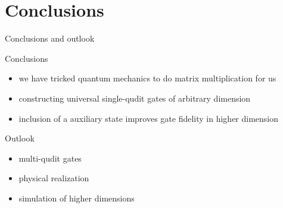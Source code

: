 \documentclass[t]{beamer}
\begin{document}


\section{Conclusions}

\begin{frame}{}
\tableofcontents[ 
currentsubsection, 
hideothersubsections, 
sectionstyle=show/shaded, 
subsectionstyle=show/shaded, 
] 
\end{frame}

\begin{frame}{Conclusions and outlook}
\begin{block}{Conclusions}
\begin{itemize}
\item we have tricked quantum mechanics to do matrix multiplication for us
\item constructing universal single-qudit gates of arbitrary dimension
\item inclusion of a auxiliary state improves gate fidelity in higher dimension
\end{itemize}

\end{block}
\begin{block}{Outlook}
\begin{itemize}
\item multi-qudit gates
\item physical realization
\item simulation of higher dimensions
\end{itemize}

\end{block}


\end{frame}
\end{document}
